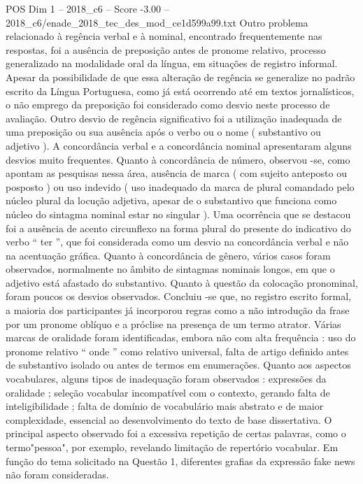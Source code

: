 \begin{textsample}{POS Dim 1 – 2018\_c6 – Score -3.00 – 2018\_c6/enade\_2018\_tec\_des\_mod\_ce1d599a99.txt}
Outro problema relacionado à regência verbal e à nominal, encontrado frequentemente nas respostas, foi a ausência de preposição antes de pronome relativo, processo generalizado na modalidade oral da língua, em situações de registro informal.
Apesar da possibilidade de que essa alteração de regência se generalize no padrão escrito da Língua Portuguesa, como já está ocorrendo até em textos jornalísticos, o não emprego da preposição foi considerado como desvio neste processo de avaliação.
Outro desvio de regência significativo foi a utilização inadequada de uma preposição ou sua ausência após o verbo ou o nome ( substantivo ou adjetivo ).
A concordância verbal e a concordância nominal apresentaram alguns desvios muito frequentes.
Quanto à concordância de número, observou -se, como apontam as pesquisas nessa área, ausência de marca ( com sujeito anteposto ou posposto ) ou uso indevido ( uso inadequado da marca de plural comandado pelo núcleo plural da locução adjetiva, apesar de o substantivo que funciona como núcleo do sintagma nominal estar no singular ).
Uma ocorrência que se destacou foi a ausência de acento circunflexo na forma plural do presente do indicativo do verbo “ ter ”, que foi considerada como um desvio na concordância verbal e não na acentuação gráfica.
Quanto à concordância de gênero, vários casos foram observados, normalmente no âmbito de sintagmas nominais longos, em que o adjetivo está afastado do substantivo.
Quanto à questão da colocação pronominal, foram poucos os desvios observados.
Concluiu -se que, no registro escrito formal, a maioria dos participantes já incorporou regras como a não introdução da frase por um pronome oblíquo e a próclise na presença de um termo atrator.
Várias marcas de oralidade foram identificadas, embora não com alta frequência : uso do pronome relativo “ onde ” como relativo universal, falta de artigo definido antes de substantivo isolado ou antes de termos em enumerações.
Quanto aos aspectos vocabulares, alguns tipos de inadequação foram observados : expressões da oralidade ; seleção vocabular incompatível com o contexto, gerando falta de inteligibilidade ; falta de domínio de vocabulário mais abstrato e de maior complexidade, essencial ao desenvolvimento do texto de base dissertativa.
O principal aspecto observado foi a excessiva repetição de certas palavras, como o termo"pessoa", por exemplo, revelando limitação de repertório vocabular.
Em função do tema solicitado na Questão 1, diferentes grafias da expressão fake news não foram consideradas.

\end{textsample}
